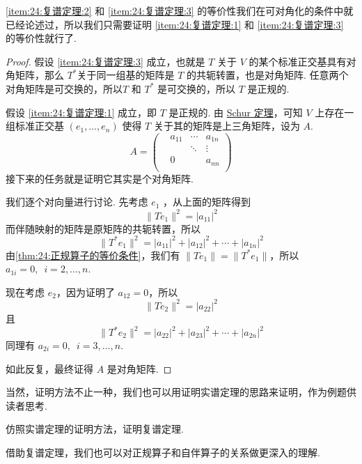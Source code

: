 \ref*{item:24:复谱定理:2} 和 \ref*{item:24:复谱定理:3} 的等价性我们在可对角化的条件中就已经论述过，所以我们只需要证明 \ref*{item:24:复谱定理:1} 和 \ref*{item:24:复谱定理:3} 的等价性就行了.

\begin{proof}
    假设 \ref*{item:24:复谱定理:3} 成立，也就是 $ T $ 关于 $ V $ 的某个标准正交基具有对角矩阵，那么 $ T^* $关于同一组基的矩阵是 $ T $ 的共轭转置，也是对角矩阵. 任意两个对角矩阵是可交换的，所以$ T $ 和 $ T^* $ 是可交换的，所以 $ T $ 是正规的.

    假设 \ref*{item:24:复谱定理:1} 成立，即 $ T $ 是正规的. 由 \hyperref[thm:23:Schur]{Schur 定理}，可知 $ V $ 上存在一组标准正交基 $ (e_1, \ldots , e_n) $ 使得 $ T $ 关于其的矩阵是上三角矩阵，设为 $ A $.
    \[ A = \begin{pmatrix}
             & a_{11} & \cdots & a_{1n} \\
             &        & \ddots & \vdots \\
             & 0      &        & a_{nn} \\
        \end{pmatrix} \]
    接下来的任务就是证明它其实是个对角矩阵.

    我们逐个对向量进行讨论. 先考虑 $ e_1 $ ，从上面的矩阵得到
    \[ \lVert Te_1 \rVert^2 = \lvert a_{11} \rvert^2 \]
    而伴随映射的矩阵是原矩阵的共轭转置，所以
    \[ \lVert T^*e_1 \rVert^2 = \lvert a_{11} \rvert^2 + \lvert a_{12} \rvert^2 + \cdots + \lvert a_{1n} \rvert^2 \]
    由\autoref{thm:24:正规算子的等价条件}，我们有 $ \lVert Te_1 \rVert = \lVert T^*e_1 \rVert $，所以 $ a_{1i} = 0,\enspace i = 2, \ldots , n $.

    现在考虑 $ e_2 $，因为证明了 $ a_{12} = 0 $，所以
    \[ \lVert Te_2 \rVert^2 = \lvert a_{22} \rvert^2 \]
    且
    \[ \lVert T^*e_2 \rVert^2 = \lvert a_{22} \rvert^2 + \lvert a_{23} \rvert^2 + \cdots + \lvert a_{2n} \rvert^2 \]
    同理有 $ a_{2i} = 0,\enspace i = 3, \ldots , n $.

    如此反复，最终证得 $ A $ 是对角矩阵.
\end{proof}

当然，证明方法不止一种，我们也可以用证明实谱定理的思路来证明，作为例题供读者思考.

\begin{example}
    仿照实谱定理的证明方法，证明复谱定理.
\end{example}

借助复谱定理，我们也可以对正规算子和自伴算子的关系做更深入的理解.

